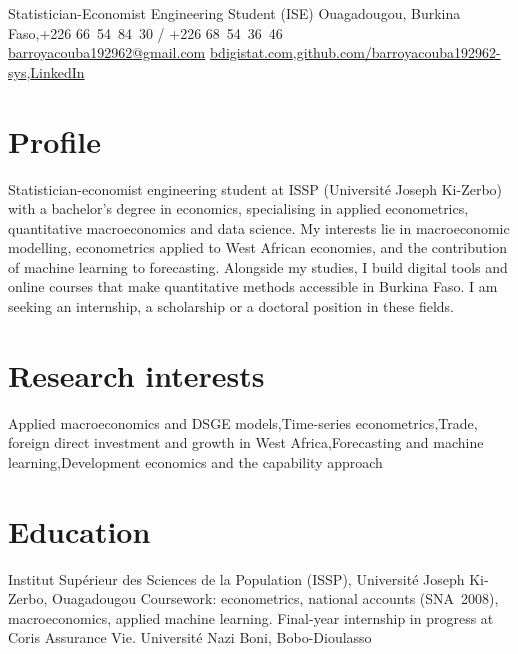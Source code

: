 \documentclass[10pt]{article}
\begin{document}
  {Statistician-Economist Engineering Student (ISE)}
  {Ouagadougou, Burkina Faso\sep +226 66~54~84~30 / +226 68~54~36~46\\[1pt]\href{mailto:barroyacouba192962@gmail.com}{barroyacouba192962@gmail.com}}
  {\href{https://bdigistat.com}{bdigistat.com}\sep \href{https://github.com/barroyacouba192962-sys}{github.com/barroyacouba192962-sys}\sep \href{https://www.linkedin.com/in/barro-undefined-b30b47340/}{LinkedIn}}
  {}

\section{Profile}
Statistician-economist engineering student at ISSP (Université Joseph Ki-Zerbo) with a bachelor's degree in economics,
specialising in applied econometrics, quantitative macroeconomics and data science. My interests lie in macroeconomic
modelling, econometrics applied to West African economies, and the contribution of machine learning to forecasting.
Alongside my studies, I build digital tools and online courses that make quantitative methods accessible in Burkina Faso.
I am seeking an internship, a scholarship or a doctoral position in these fields.

\section{Research interests}
Applied macroeconomics and DSGE models\sep Time-series econometrics\sep Trade, foreign direct investment and growth
in West Africa\sep Forecasting and machine learning\sep Development economics and the capability approach

\section{Education}
  {Institut Supérieur des Sciences de la Population (ISSP), Université Joseph Ki-Zerbo, Ouagadougou}
  {Coursework: econometrics, national accounts (SNA~2008), macroeconomics, applied machine learning.
   Final-year internship in progress at Coris Assurance Vie.}
  {Université Nazi Boni, Bobo-Dioulasso}{}
\end{document}
